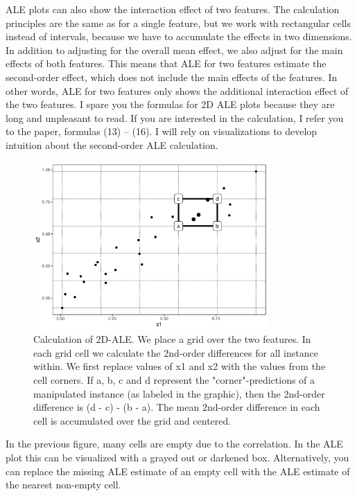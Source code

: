 \documentclass[
  10pt,
]{scrbook}
\begin{document}
ALE plots can also show the interaction effect of two features.
The calculation principles are the same as for a single feature, but we work with rectangular cells instead of intervals, because we have to accumulate the effects in two dimensions.
In addition to adjusting for the overall mean effect, we also adjust for the main effects of both features.
This means that ALE for two features estimate the second-order effect, which does not include the main effects of the features.
In other words, ALE for two features only shows the additional interaction effect of the two features.
I spare you the formulas for 2D ALE plots because they are long and unpleasant to read.
If you are interested in the calculation, I refer you to the paper, formulas (13) -- (16).
I will rely on visualizations to develop intuition about the second-order ALE calculation.

\begin{figure}

{\centering \includegraphics[width=0.8\textwidth]{images/aleplot-computation-2d-1} 

}

\caption{Calculation of 2D-ALE. We place a grid over the two features. In each grid cell we calculate the 2nd-order differences for all instance within. We first replace values of x1 and x2 with the values from the cell corners. If a, b, c and d represent the "corner"-predictions of a manipulated instance (as labeled in the graphic), then the 2nd-order difference is (d - c) - (b - a). The mean 2nd-order difference in each cell is accumulated over the grid and centered.}\label{fig:aleplot-computation-2d}
\end{figure}

In the previous figure, many cells are empty due to the correlation.
In the ALE plot this can be visualized with a grayed out or darkened box.
Alternatively, you can replace the missing ALE estimate of an empty cell with the ALE estimate of the nearest non-empty cell.
\end{document}
